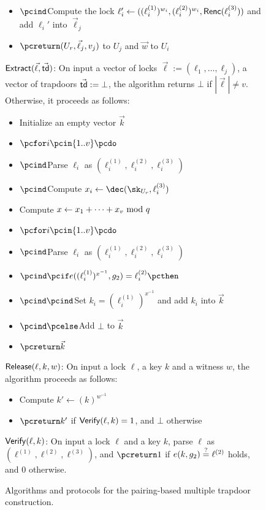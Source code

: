 \begin{figure*}[htb]
\begin{center}
{\begin{minipage}[t]{0.75\textwidth}
\begin{itemize}[label=-]
				$(\ell_i^{(1)},\ell_i^{(2)},\ell_i^{(3)})$
				\item $\pcind$Compute the lock $\ell_i' \gets((\ell_i^{(1)})^{w_i},
				(\ell_i^{(2)})^{w_i},\mathsf{Renc}(\ell_i^{(3)}))$ and add $\ell_i'$ into $\vec{\ell}_j$
				\item $\pcreturn (U_r,\vec{\ell}_j,v_j)$ to $U_j$ and $\vec{w}$ to $U_i$
			\end{itemize}
			\underline{$\mathsf{Extract}(\vec{\ell}, \vec{\mathsf{td}})$}: On input a vector of locks 
			$\vec{\ell} := (\ell_1,\ldots,\ell_j)$, a vector of trapdoors $\vec{\mathsf{td}} := \bot$, 
			the algorithm returns $\bot$ if $|\vec{\ell}| \neq v$. Otherwise, it proceeds as 
			follows:
			\begin{itemize}[label=-]
				\item Initialize an empty vector $\vec{k}$
				\item $\pcfor i \pcin \{1..v\} \pcdo$
				\item $\pcind$Parse $\ell_i$ as $(\ell_i^{(1)},\ell_i^{(2)},\ell_i^{(3)})$
				\item $\pcind$Compute $x_i \gets \dec(\sk_{U_r},\ell_i^{(3)})$
				\item Compute $x \gets x_1 + \cdots + x_v \ \mathrm{mod}\ q$
				\item $\pcfor i \pcin \{1..v\} \pcdo$
				\item $\pcind$Parse $\ell_i$ as $(\ell_i^{(1)},\ell_i^{(2)},\ell_i^{(3)})$
				\item $\pcind \pcif e((\ell_i^{(1)})^{x^{-1}}, g_2) = \ell_i^{(2)} \pcthen$
				\item $\pcind \pcind$Set $k_i = (\ell_i^{(1)})^{x^{-1}}$ and add $k_i$ into 
				$\vec{k}$
				\item $\pcind \pcelse$Add $\bot$ to $\vec{k}$
				\item $\pcreturn \vec{k}$
			\end{itemize}
			\underline{$\mathsf{Release}(\ell, k, w)$}: On input a lock $\ell$, a key $k$ and 
			a witness $w$, the algorithm proceeds as follows:
			\begin{itemize}[label=-]
				\item Compute $k' \gets (k)^{w^{-1}}$
				\item $\pcreturn k'$ if $\mathsf{Verify}(\ell, k) = 1$, and $\bot$ otherwise
			\end{itemize}
			\underline{$\mathsf{Verify}(\ell, k)$}: On input a lock $\ell$ and a key $k$, 
			parse $\ell$ as $(\ell^{(1)},\ell^{(2)}, \ell^{(3)})$, and $\pcreturn 1$ if $e(k, g_2) \stackrel{?}{=} 
			\ell^{(2)}$ holds, and 0 otherwise.
		\end{minipage}
	}
	\end{center}
	
	\caption{Algorithms and protocols for the pairing-based multiple trapdoor construction.}
	\label{fig:single-trapdoor}
\end{figure*}

